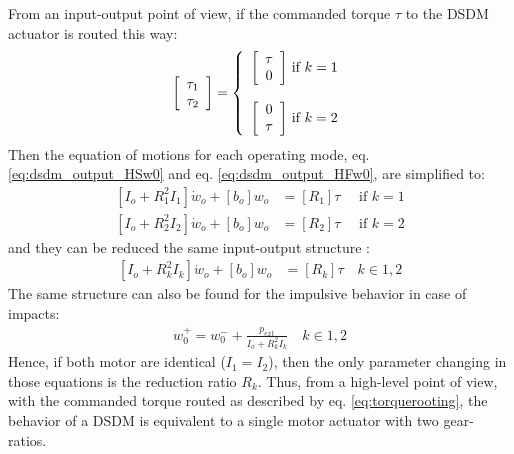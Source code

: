 From an input-output point of view, if the commanded torque $\tau$ to the DSDM actuator is routed this way:
%
\begin{align}
\left[ \begin{array}{c}
\tau_1 \\
\tau_2
\end{array} \right]
 =  
\left\{
\begin{array}{c@{}c}
\left[ \begin{array}{c} \tau \\ 0 \end{array} \right] & \text{ if } k=1  \\ \\
\left[ \begin{array}{c} 0 \\ \tau \end{array} \right] & \text{ if } k=2  \\
\end{array} 
\right. 
\label{eq:torquerooting}
\end{align}
%
Then the equation of motions for each operating mode, eq. \eqref{eq:dsdm_output_HSw0} and eq. \eqref{eq:dsdm_output_HFw0}, are simplified to:
%
\begin{align}
\left[ I_o + R_1^2 I_1 \right] \dot{w}_o +  \left[ b_o \right] w_o  &= \left[ R_1 \right] \tau  \quad \text{ if } k=1  %
\label{eq:dsdm_output_R1} \\
\left[ I_o + R_2^2 I_2 \right] \dot{w}_o +  \left[ b_o \right] w_o  &= \left[ R_2 \right] \tau  \quad \text{ if } k=2  %
\label{eq:dsdm_output_R2}
\end{align}
%
and they can be reduced the same input-output structure :
%
\begin{align}
\left[ I_o + R_k^2 I_k \right] \dot{w}_o +  \left[ b_o \right] w_o  &= \left[ R_k \right] \tau \quad k \in {1,2}
\label{eq:dsdm_output_R} 
\end{align}
%
The same structure can also be found for the impulsive behavior in case of impacts:
%
\begin{align}
w_0^+  =  w_0^- + \frac{p_{ext}}{I_o + R_k^2  I_k } \quad k \in {1,2}
\end{align}
%
Hence, if both motor are identical ($I_1=I_2$), then the only parameter changing in those equations is the reduction ratio $R_k$. Thus, from a high-level point of view, with the commanded torque routed as described by eq. \eqref{eq:torquerooting}, the behavior of a DSDM is equivalent to a single motor actuator with two gear-ratios. 


